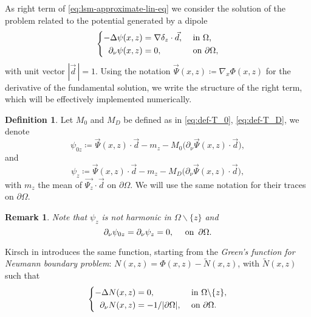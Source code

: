 \documentclass[10pt, a4paper, twoside, openright]{book}
\theoremstyle{definition}
\newtheorem{definition}[subsection]{Definition}
\theoremstyle{plain}
\theoremstyle{plain}
\theoremstyle{plain}
\theoremstyle{plain}
\newtheorem{remark}[subsection]{Remark}
\theoremstyle{plain}
\theoremstyle{plain}
\theoremstyle{plain}
\theoremstyle{plain}
\begin{document}
 As right term of \eqref{eq:lsm-approximate-lin-eq} we consider the solution of the problem related to the potential generated by a dipole
 \begin{equation}
 \left\{
 \begin{aligned}
   -\Delta \psi(x,z) &= \nabla\delta_{z} \cdot \vec{d}, && \textup{ in }\Omega ,\\
   \partial_\nu\psi(x,z) &= 0, &&\textup{ on }\partial \Omega,
 \end{aligned}
 \right.
 \end{equation}
 with unit vector $|\vec{d}\,|=1$. Using the notation $\vec{\Psi}(x,z)\coloneqq\nabla_x\Phi(x,z)$ for the derivative of the fundamental solution, we write the structure of the right term, which will be effectively implemented numerically.
 \begin{definition}
 \label{def:lsm-psi}
  Let $M_0$ and $M_D$ be defined as in \eqref{eq:def-T_0}, \eqref{eq:def-T_D}, we denote
 \begin{equation}
 \psi_{0z} \coloneqq \vec{\Psi}(x,z)\cdot\vec{d} - m_z - M_0\bigl(\partial_\nu \vec{\Psi}(x,z) \cdot \vec{d}\bigr),
  \end{equation}
  and
  \begin{equation}
  \psi_{z} \coloneqq \vec{\Psi}(x,z)\cdot\vec{d} - m_z - M_D\bigl(\partial_\nu \vec{\Psi}(x,z) \cdot \vec{d}\bigr),
  \end{equation}
  with $m_z$ the mean of $\vec{\Psi_z}\cdot\vec{d}$ on $\partial \Omega$. We will use the same notation for their traces on $\partial \Omega$.
 \end{definition}
 \begin{remark}
  Note that $\psi_z$ is not harmonic in $\Omega\backslash\{z\}$ and
  \begin{equation*}
  \partial_\nu \psi_{0z} = \partial_\nu \psi_z = 0,\quad\textup{ on }\,\partial \Omega.
  \end{equation*}
 \end{remark}
 Kirsch in \cite{kirsch:book} introduces the same function, starting from the \emph{Green's function for Neumann boundary problem}: $N(x,z)=\Phi(x,z)-\tilde{N}(x,z)$, with $\tilde{N}(x,z)$ such that
 \begin{equation}
 \left\{
 \begin{aligned}
   -\Delta N(x,z) &= 0, &&\textup{ in }\Omega\backslash\{z\} ,\\
   \partial_\nu N(x,z) &= -1/|\partial \Omega|,&&\textup{ on }\partial \Omega.
 \end{aligned}
 \right.
 \end{equation}
\end{document}
